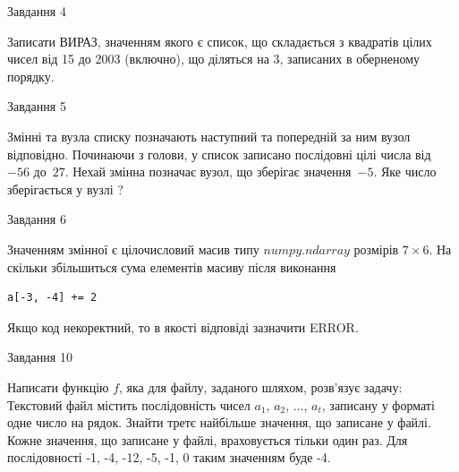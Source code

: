 \documentclass[12pt, ukrainian]{article}
\begin{document}
{\begin{minipage}[t]{8.0cm}
\begin{verbatim}
\end{verbatim}            

\end{minipage}


               
{\begin{center}Завдання {4}\end{center}}
\vspace{-4mm}

Записати ВИРАЗ, значенням якого є список, що складається з квадратів цілих чисел від 15 до 2003 (включно), що діляться на 3, записаних в обернено\-му порядку.\par

\vspace{10mm}
               
{\begin{center}Завдання {5}\end{center}}
\vspace{-4mm}
Змінні  та  вузла списку позначають наступний та попередній за ним вузол відповідно. Починаючи з голови, у список записано послідовні цілі числа від~$-56$ до~$27$. Нехай змінна  позначає вузол, що зберігає значення~$-5$.
Яке число зберігається у вузлі  ?\par

               
{\begin{center}Завдання {6}\end{center}}
\vspace{-4mm}
Значенням змінної  є цілочисловий масив типу $numpy.ndarray$ розмірів $7{\times}6$. На скільки збільшиться сума елементів масиву  після виконання
\begin{verbatim}
a[-3, -4] += 2
\end{verbatim}


Якщо код некоректний, то в якості відповіді зазначити ERROR.\par

               
{\begin{center}Завдання {10}\end{center}}
\vspace{-4mm}

Написати функцію $f$, яка для файлу, заданого шляхом, розв’язує задачу:\\ Текстовий файл містить послідовність чисел $a_1$, $a_2$, $\ldots$, $a_t$, записану у форматі одне число на рядок. Знайти третє найбільше значення, що записане у файлі. Кожне значення, що записане у файлі, враховується тільки один раз. Для послідовності -1, -4, -12, -5, -1, 0 таким значенням буде -4.

}
\end{document}
